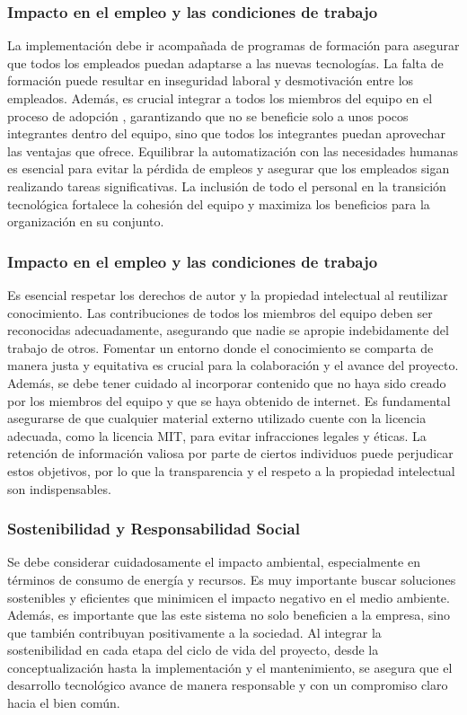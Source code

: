 \subsubsection{Impacto en el empleo y las condiciones de trabajo}
La implementación debe ir acompañada de programas de formación para asegurar 
que todos los empleados puedan adaptarse a las nuevas tecnologías. La falta de formación 
puede resultar en inseguridad laboral y desmotivación entre los empleados. Además, es 
crucial integrar a todos los miembros del equipo en el proceso de adopción , 
garantizando que no se beneficie solo a unos pocos integrantes dentro del equipo, sino que 
todos los integrantes puedan aprovechar las ventajas que ofrece. Equilibrar 
la automatización con las necesidades humanas es esencial para evitar la pérdida de 
empleos y asegurar que los empleados sigan realizando tareas significativas. La inclusión 
de todo el personal en la transición tecnológica fortalece la cohesión del equipo y 
maximiza los beneficios para la organización en su conjunto.

\subsubsection{Impacto en el empleo y las condiciones de trabajo}
Es esencial respetar los derechos de autor y la propiedad intelectual 
al reutilizar conocimiento. Las contribuciones de todos los miembros 
del equipo deben ser reconocidas adecuadamente, asegurando que nadie se 
apropie indebidamente del trabajo de otros. Fomentar un entorno donde el 
conocimiento se comparta de manera justa y equitativa es crucial para la colaboración 
y el avance del proyecto. Además, se debe tener cuidado al incorporar contenido que 
no haya sido creado por los miembros del equipo y que se haya obtenido de internet. 
Es fundamental asegurarse de que cualquier material externo utilizado cuente con la 
licencia adecuada, como la licencia MIT, para evitar infracciones legales y éticas. La 
retención de información valiosa por parte de ciertos individuos puede perjudicar 
estos objetivos, por lo que la transparencia y el respeto a la propiedad intelectual son indispensables.

\subsubsection{Sostenibilidad y Responsabilidad Social} %
Se debe considerar cuidadosamente el impacto ambiental, especialmente en términos de 
consumo de energía y recursos. Es muy importante buscar soluciones sostenibles y 
eficientes que minimicen el impacto negativo en el medio ambiente. Además, es importante que 
las este sistema no solo beneficien a la empresa, sino que también contribuyan positivamente 
a la sociedad. Al integrar la sostenibilidad en cada etapa del ciclo de vida del proyecto, 
desde la conceptualización hasta la implementación y el mantenimiento, se asegura que el 
desarrollo tecnológico avance de manera responsable y con un compromiso claro hacia el bien común.


